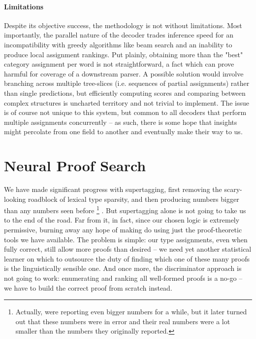 \paragraph{Limitations}
Despite its objective success, the methodology is not without limitations.
Most importantly, the parallel nature of the decoder trades inference speed for an incompatibility with greedy algorithms like beam search and an inability to produce local assignment rankings.
Put plainly, obtaining more than the "best" category assignment per word is not straightforward, a fact which can prove harmful for coverage of a downstream parser.
A possible solution would involve branching across multiple tree-slices (i.e. sequences of partial assignments) rather than single predictions, but efficiently computing scores and comparing between complex structures is uncharted territory and not trivial to implement.
The issue is of course not unique to this system, but common to all decoders that perform multiple assignments concurrently -- as such, there is some hope that insights might percolate from one field to another and eventually make their way to us.

\section{Neural Proof Search}
\label{section:npn}
We have made significant progress with supertagging, first removing the scary-looking roadblock of lexical type sparsity, and then producing numbers bigger than any numbers seen before%
	\footnote{Actually, \citet{tian2020supertagging} were reporting even bigger numbers for a while, but it later turned out that these numbers were in error and their real numbers were a lot smaller than the numbers they originally reported.
	}%
.
But supertagging alone is not going to take us to the end of the road.
Far from it, in fact, since our chosen logic is extremely permissive, burning away any hope of making do using just the proof-theoretic tools we have available.
The problem is simple: our type assignments, even when fully correct, still allow more proofs than desired -- we need yet another statistical learner on which to outsource the duty of finding which one of these many proofs is the linguistically sensible one.
And once more, the discriminator approach is not going to work: enumerating and ranking all well-formed proofs is a no-go -- we have to build the correct proof from scratch instead.


